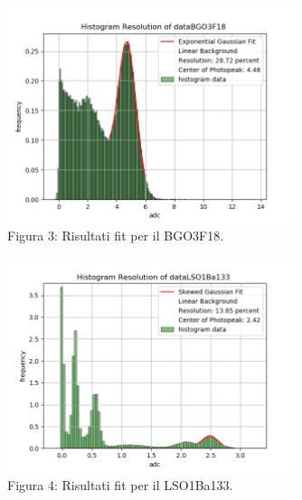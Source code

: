 \documentclass[a4paper]{article}
\begin{document}
\begin{figure}[H]
\centering
\includegraphics[width=0.75\textwidth]{histdataBGO3F18}
\caption{Figura 3: Risultati fit per il BGO3F18.}
\end{figure}
\begin{figure}[H]
\centering
\includegraphics[width=0.75\textwidth]{histdataLSO1Ba133}
\caption{Figura 4: Risultati fit per il LSO1Ba133.}
\end{figure}
\end{document}
